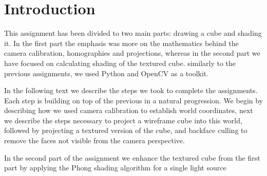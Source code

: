 \pagebreak

\section{Introduction}

This assignment has been divided to two main parts: drawing a cube and shading it. In the first part the emphasis was more on the mathematics behind the camera calibration, homographies and projections, whereas in the second part we have focused on calculating shading of the textured cube. similarly to the previous assignments, we used Python and OpenCV as a toolkit.

In the following text we describe the steps we took to complete the assignments. Each step is building on top of  the previous in a natural progression. We begin by describing how we used camera calibration to establish world coordinates, next we describe the steps necessary to project a wireframe cube into this world, followed by projecting a textured version of the cube, and backface culling to remove the faces not visible from the camera perspective.

In the second part of the assignment we enhance the textured cube from the first part by applying the Phong shading algorithm for a single light source
